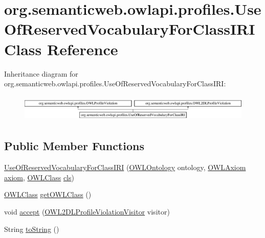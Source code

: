 \hypertarget{classorg_1_1semanticweb_1_1owlapi_1_1profiles_1_1_use_of_reserved_vocabulary_for_class_i_r_i}{\section{org.\-semanticweb.\-owlapi.\-profiles.\-Use\-Of\-Reserved\-Vocabulary\-For\-Class\-I\-R\-I Class Reference}
\label{classorg_1_1semanticweb_1_1owlapi_1_1profiles_1_1_use_of_reserved_vocabulary_for_class_i_r_i}
}
Inheritance diagram for org.\-semanticweb.\-owlapi.\-profiles.\-Use\-Of\-Reserved\-Vocabulary\-For\-Class\-I\-R\-I\-:\begin{figure}[H]
\begin{center}
\leavevmode
\includegraphics[height=1.317647cm]{classorg_1_1semanticweb_1_1owlapi_1_1profiles_1_1_use_of_reserved_vocabulary_for_class_i_r_i}
\end{center}
\end{figure}
\subsection*{Public Member Functions}
\begin{DoxyCompactItemize}
\item 
\hyperlink{classorg_1_1semanticweb_1_1owlapi_1_1profiles_1_1_use_of_reserved_vocabulary_for_class_i_r_i_a834e565ea3f4d5182a253f0e1c03a8cd}{Use\-Of\-Reserved\-Vocabulary\-For\-Class\-I\-R\-I} (\hyperlink{interfaceorg_1_1semanticweb_1_1owlapi_1_1model_1_1_o_w_l_ontology}{O\-W\-L\-Ontology} ontology, \hyperlink{interfaceorg_1_1semanticweb_1_1owlapi_1_1model_1_1_o_w_l_axiom}{O\-W\-L\-Axiom} \hyperlink{classorg_1_1semanticweb_1_1owlapi_1_1profiles_1_1_o_w_l_profile_violation_aa7c8e8910ed3966f64a2c003fb516214}{axiom}, \hyperlink{interfaceorg_1_1semanticweb_1_1owlapi_1_1model_1_1_o_w_l_class}{O\-W\-L\-Class} \hyperlink{classorg_1_1semanticweb_1_1owlapi_1_1profiles_1_1_use_of_reserved_vocabulary_for_class_i_r_i_a5bfc7920add73d5d5f4a275cdbe6a649}{cls})
\item 
\hyperlink{interfaceorg_1_1semanticweb_1_1owlapi_1_1model_1_1_o_w_l_class}{O\-W\-L\-Class} \hyperlink{classorg_1_1semanticweb_1_1owlapi_1_1profiles_1_1_use_of_reserved_vocabulary_for_class_i_r_i_abf1ab3e08e1fbc6b2923231c0c68bfa0}{get\-O\-W\-L\-Class} ()
\item 
void \hyperlink{classorg_1_1semanticweb_1_1owlapi_1_1profiles_1_1_use_of_reserved_vocabulary_for_class_i_r_i_a41e27bc7589553ff57a908ac6be53c79}{accept} (\hyperlink{interfaceorg_1_1semanticweb_1_1owlapi_1_1profiles_1_1_o_w_l2_d_l_profile_violation_visitor}{O\-W\-L2\-D\-L\-Profile\-Violation\-Visitor} visitor)
\item 
String \hyperlink{classorg_1_1semanticweb_1_1owlapi_1_1profiles_1_1_use_of_reserved_vocabulary_for_class_i_r_i_a6aa97cc5fe876ad5411f50908c16586e}{to\-String} ()
\end{DoxyCompactItemize}
